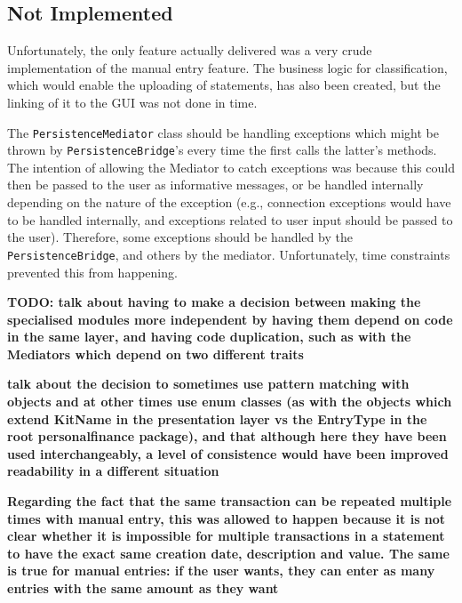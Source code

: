 \subsection{Not Implemented}
Unfortunately, the only feature actually delivered was a very crude
implementation of the manual entry feature.  The business logic for
classification, which would enable the uploading of statements, has also been
created, but the linking of it to the GUI was not done in time.

The \texttt{PersistenceMediator} class should be handling exceptions which
might be thrown by \texttt{PersistenceBridge}'s every time the first calls the
latter's methods. The intention of allowing the Mediator to catch exceptions
was because this could then be passed to the user as informative messages, or
be handled internally depending on the nature of the exception (e.g.,
connection exceptions would have to be handled internally, and exceptions
related to user input should be passed to the user). Therefore, some exceptions
should be handled by the \texttt{PersistenceBridge}, and others by the
mediator. Unfortunately, time constraints prevented this from happening.

\textbf{TODO: talk about having to make a decision between making the
specialised modules more independent by having them depend on code in the same
layer, and having code duplication, such as with the Mediators which depend on
two different traits}


\textbf{talk about the decision to sometimes use pattern matching with objects
and at other times use enum classes (as with the objects which extend KitName
in the presentation layer vs the EntryType in the root personalfinance
package), and that although here they have been used interchangeably, a level
of consistence would have been improved readability in a different situation}

\textbf{Regarding the fact that the same transaction can be repeated multiple
times with manual entry, this was allowed to happen because it is not clear
whether it is impossible for multiple transactions in a statement to have the
exact same creation date, description and value. The same is true for manual
entries: if the user wants, they can enter as many entries with the same amount
as they want}
